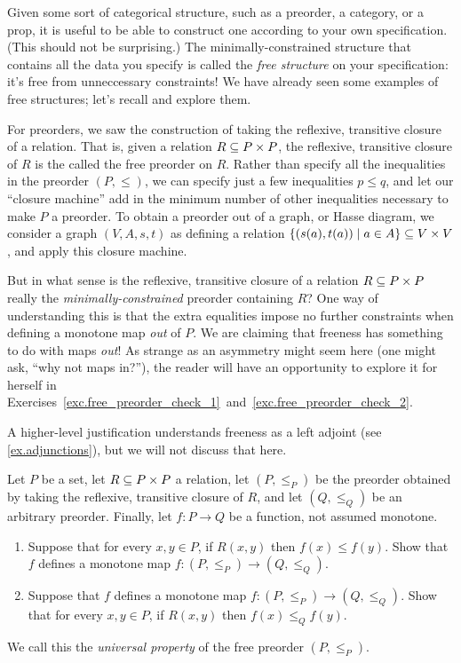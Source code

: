\documentclass[7Sketches]{subfiles}
\begin{document}
Given some sort of categorical structure, such as a preorder, a category, or a prop,
it is useful to be able to construct one according to your own specification.
(This should not be surprising.) The minimally-constrained structure that
contains all the data you specify is called the \emph{free structure} on your
specification: it's free from unneccessary constraints! We have already seen
some examples of free structures; let's recall and explore them.

\begin{example}%
%
%
For preorders, we saw the construction of taking the reflexive, transitive closure
of a relation. That is, given a relation $R\ss P\times P$, the reflexive,
transitive closure of $R$ is the called the free preorder on $R$. Rather than
specify all the inequalities in the preorder $(P,\leq)$, we can specify just a few
inequalities $p \le q$, and let our ``closure machine'' add in the minimum
number of other inequalities necessary to make $P$ a preorder. To obtain a preorder
out of a graph, or Hasse diagram, we consider a
graph $(V,A,s,t)$ as defining a relation $\{(s(a),t(a)) \mid a \in A\} \ss V
\times V$, and apply this closure machine.

But in what sense is the reflexive, transitive closure of a relation $R\ss P\times P$ really the \emph{minimally-constrained} preorder containing $R$? One way of understanding this is that the extra equalities impose
no further constraints when defining a monotone map \emph{out} of $P$. We are
claiming that freeness has something to do with maps \emph{out}! As strange as
an asymmetry might seem here (one might ask, ``why not maps in?''), the reader
will have an opportunity to explore it for herself in Exercises~\ref{exc.free_preorder_check_1}~and~\ref{exc.free_preorder_check_2}.%

A higher-level justification understands freeness as a left adjoint (see
\cref{ex.adjunctions}), but we will not discuss that here.
\end{example}

\begin{exercise}%
\label{exc.free_preorder_check_1}
Let $P$ be a set, let $R\ss P \times P$ a relation, let $(P,\leq_P)$ be the preorder
obtained by taking the reflexive, transitive closure of $R$, and let $(Q,\leq_Q)$ be an arbitrary preorder. Finally, let $f\colon P\to Q$ be a function, not assumed monotone.
\begin{enumerate}
	\item Suppose that for every $x,y\in P$, if $R(x,y)$ then $f(x)\leq f(y)$. Show that $f$ defines a monotone map $f\colon (P,\leq_P)\to (Q,\leq_Q)$.
	\item Suppose that $f$ defines a monotone map $f\colon (P,\leq_P)\to (Q,\leq_Q)$. Show that for every $x,y\in P$, if $R(x,y)$ then $f(x)\leq_Q f(y)$.
\end{enumerate}
We call this the \emph{universal property} of the free preorder $(P,\leq_P)$.%
\end{exercise}
\end{document}
